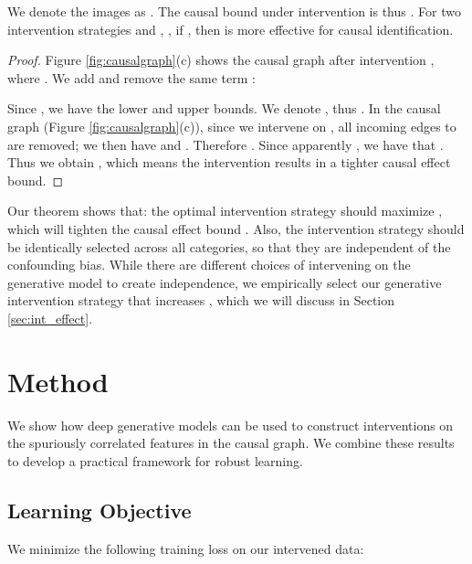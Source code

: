 \documentclass[final]{cvpr}
\begin{document}
\begin{theorem}\label{th:2IV}
We denote the images as . The causal bound under intervention  is thus . For two intervention strategies  and ,  , if  , then  is more effective for causal identification. 
\end{theorem}

\begin{proof}
Figure \ref{fig:causalgraph}(c) shows the causal graph after intervention , where .  We add and remove the same term :
\begingroup\makeatletter\def\f@size{9}\check@mathfonts

\endgroup
Since , we have the lower and upper bounds. 
We denote , thus  . In the causal graph (Figure \ref{fig:causalgraph}(c)), since we intervene on , all incoming edges  to  are removed; 
we then have  and . Therefore . Since apparently , we have that . Thus we obtain , which means the intervention  results in a tighter causal effect bound.
\end{proof}


Our theorem shows that: the optimal intervention strategy should maximize , which will tighten the causal effect bound . Also, the intervention strategy should be identically selected across all categories, so that they are independent of the confounding bias. While there are different choices of intervening on the generative model to create independence, we empirically select our generative intervention strategy that increases , which we will discuss in Section \ref{sec:int_effect}.










 \vspace{-3mm}
\section{Method}
\label{sec:method}
We show how deep generative models can be used to construct interventions on the spuriously correlated features in the causal graph. We combine these results to develop a practical framework for robust learning. 

\subsection{Learning Objective}

We minimize the following training loss on our intervened data:
\end{document}
